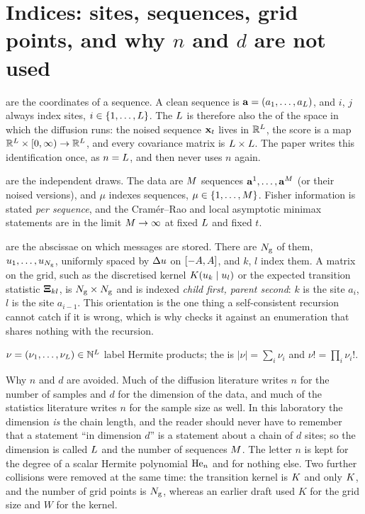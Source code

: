 \section{Indices: sites, sequences, grid points, and why $n$ and $d$ are not used}

 are the coordinates of a sequence. A clean sequence is
$\mathbf{a}=(a_1,\dots,a_{L})$, and $i$, $j$ always index sites, $i\in\{1,\dots,L\}$.
The  $L$ is therefore also the  of
the space in which the diffusion runs: the noised sequence $\mathbf{x}_t$ lives in
$\mathbb{R}^{L}$, the score is a map $\mathbb{R}^{L}\times[0,\infty)\to\mathbb{R}^{L}$,
and every covariance matrix is $L\times L$. The paper writes this
identification once, as $n=L$, and then never uses $n$ again.

 are the independent draws. The data are $M$ sequences
$\mathbf{a}^{1},\dots,\mathbf{a}^{M}$ (or their noised versions), and $\mu$ indexes sequences,
$\mu\in\{1,\dots,M\}$. Fisher information is stated \emph{per sequence}, and the
Cram\'er--Rao and local asymptotic minimax statements are in the limit
$M\to\infty$ at fixed $L$ and fixed $t$.

 are the abscissae on which messages are stored. There are
$N_{\mathrm{g}}$ of them, $u_{1},\dots,u_{N_{\mathrm{g}}}$, uniformly spaced by $\Delta u$ on
$[-A,A]$, and $k$, $l$ index them. A matrix on the grid, such as the
discretised kernel $K(u_{k}\mid u_{l})$ or the expected transition
statistic $\mathbf{\Xi}_{kl}$, is $N_{\mathrm{g}}\times N_{\mathrm{g}}$ and is indexed \emph{child first, parent
second}: $k$ is the site $a_i$, $l$ is the site $a_{i-1}$. This orientation is the one
thing a self-consistent recursion cannot catch if it is wrong, which is why
 checks it against an enumeration that shares
nothing with the recursion.

 $\nu=(\nu_1,\dots,\nu_{L})\in\mathbb{N}^{L}$ label
Hermite products; the  is $|\nu|=\sum_i\nu_i$ and $\nu!=\prod_i\nu_i!$.

Why $n$ and $d$ are avoided. Much of the diffusion literature writes $n$ for the number
of samples and $d$ for the dimension of the data, and much of the statistics
literature writes $n$ for the sample size as well. In this laboratory the dimension
\emph{is} the chain length, and the reader should never have to remember that a
statement ``in dimension $d$'' is a statement about a chain of $d$ sites; so the
dimension is called $L$ and the number of sequences $M$. The letter $n$ is
kept for the degree of a scalar Hermite polynomial $\mathrm{He}_{n}$ and for nothing else.
Two further collisions were removed at the same time: the transition kernel is $K$
and only $K$, and the number of grid points is $N_{\mathrm{g}}$, whereas an earlier draft
used $K$ for the grid size and $W$ for the kernel.

